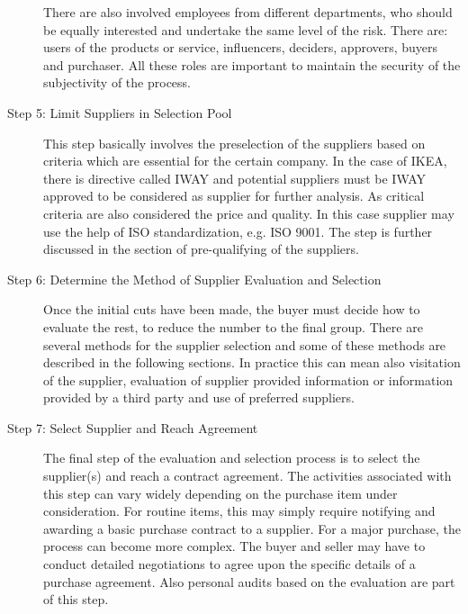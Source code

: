 \documentclass[oneside,12pt]{article}%
\begin{document}
\begin{description}
\begin{itemize}
  \end{itemize}
  There are also involved employees from different departments, who should be equally interested and undertake the same level of the risk. There are: users of the products or service, influencers, deciders, approvers, buyers and purchaser. All these roles are important to maintain the security of the subjectivity of the process.


  \item[Step 5: Limit Suppliers in Selection Pool]

  This step basically involves the preselection of the suppliers based on criteria which are essential for the certain company. In the case of IKEA, there is directive called IWAY and potential suppliers must be IWAY approved to be considered as supplier for further analysis. As critical criteria are also considered the price and quality. In this case supplier may use the help of ISO standardization, e.g. ISO 9001. The step is further discussed in the section of pre-qualifying of the suppliers.

  \item[Step 6: Determine the Method of Supplier Evaluation and Selection]
  Once the initial cuts have been made, the buyer must decide how to evaluate the rest, to reduce the number to the final group. There are several methods for the supplier selection and some of these methods are described in the following sections. In practice this can mean also visitation of the supplier, evaluation of supplier provided information or information provided by a third party and use of preferred suppliers.

  \item[Step 7: Select Supplier and Reach Agreement]
  The final step of the evaluation and selection process is to select the supplier(s) and reach a contract agreement. The activities associated with this step can vary widely depending on the purchase item under consideration. For routine items, this may simply require notifying and awarding a basic purchase contract to a supplier. For a major purchase, the process can become more complex. The buyer and seller may have to conduct detailed negotiations to agree upon the specific details of a purchase agreement. Also personal audits based on the evaluation are part of this step.

\end{description}
\end{document}
